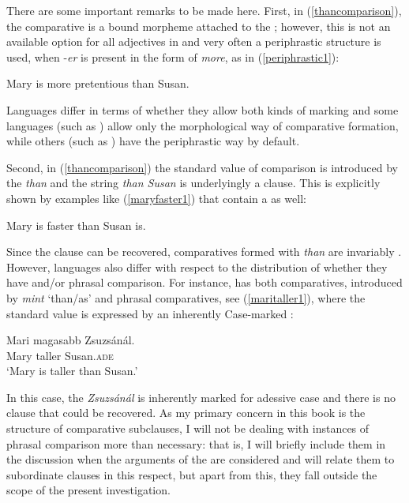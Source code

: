 There are some important remarks to be made here. First, in (\ref{thancomparison}), the comparative  is a bound morpheme attached to the ; however, this is not an available option for all adjectives in  and very often a periphrastic structure is used, when -\textit{er} is present in the form of \textit{more}, as in (\ref{periphrastic1}):

\ea	Mary is more pretentious than Susan. \label{periphrastic1}
\z

Languages differ in terms of whether they allow both kinds of  marking and some languages (such as ) allow only the morphological way of comparative  formation, while others (such as ) have the periphrastic way by default.

Second, in (\ref{thancomparison}) the standard value of comparison is introduced by the  \textit{than} and the string \textit{than Susan} is underlyingly a clause. This is explicitly shown by examples like (\ref{maryfaster1}) that contain a  as well:

\ea	Mary is faster than Susan is. \label{maryfaster1}
\z

Since the clause can be recovered, comparatives formed with \textit{than} are invariably . However, languages also differ with respect to the distribution of whether they have  and/or phrasal comparison. For instance,  has both  comparatives, introduced by \textit{mint} `than/as' and phrasal comparatives, see (\ref{maritaller1}), where the standard value is expressed by an inherently Case-marked :

\ea	\label{maritaller1} \gll Mari magasabb	Zsuzsánál.\\
Mary taller	Susan.\textsc{ade}\\
\glt `Mary is taller than Susan.'
\z

In this case, the  \textit{Zsuzsánál} is inherently marked for adessive case and there is no clause that could be recovered. As my primary concern in this book is the structure of comparative subclauses, I will not be dealing with instances of phrasal comparison more than necessary: that is, I will briefly include them in the discussion when the arguments of the  are considered and will relate them to subordinate clauses in this respect, but apart from this, they fall outside the scope of the present investigation.

